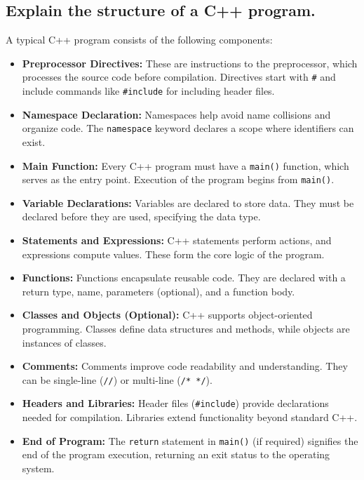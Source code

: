\subsection{Explain the structure of a C++ program.}
A typical C++ program consists of the following components:
\begin{itemize}
    \item \textbf{Preprocessor Directives:} These are instructions to the preprocessor, which processes the source code before compilation. Directives start with \texttt{\#} and include commands like \texttt{\#include} for including header files.
    \item \textbf{Namespace Declaration:} Namespaces help avoid name collisions and organize code. The \texttt{namespace} keyword declares a scope where identifiers can exist.
    \item \textbf{Main Function:} Every C++ program must have a \texttt{main()} function, which serves as the entry point. Execution of the program begins from \texttt{main()}.
    \item \textbf{Variable Declarations:} Variables are declared to store data. They must be declared before they are used, specifying the data type.
    \item \textbf{Statements and Expressions:} C++ statements perform actions, and expressions compute values. These form the core logic of the program.
    \item \textbf{Functions:} Functions encapsulate reusable code. They are declared with a return type, name, parameters (optional), and a function body.
    \item \textbf{Classes and Objects (Optional):} C++ supports object-oriented programming. Classes define data structures and methods, while objects are instances of classes.
    \item \textbf{Comments:} Comments improve code readability and understanding. They can be single-line (\texttt{//}) or multi-line (\texttt{/* */}).
    \item \textbf{Headers and Libraries:} Header files (\texttt{\#include}) provide declarations needed for compilation. Libraries extend functionality beyond standard C++.
    \item \textbf{End of Program:} The \texttt{return} statement in \texttt{main()} (if required) signifies the end of the program execution, returning an exit status to the operating system.
\end{itemize}

